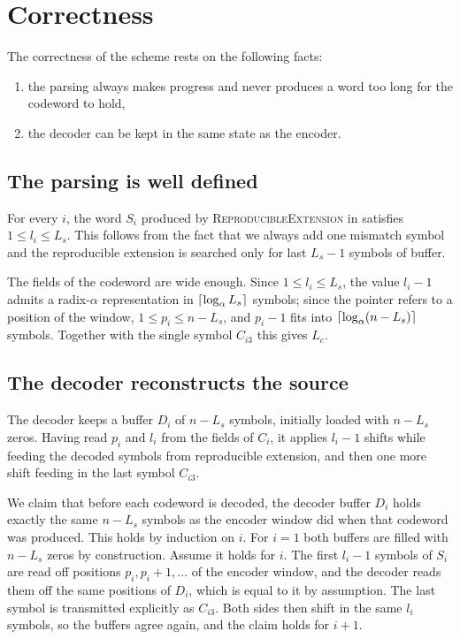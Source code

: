 
\section{Correctness}
\label{sec:lz77correctness}

The correctness of the scheme rests on the following facts:
\begin{enumerate}
    \item the parsing always makes progress and never produces a word too long for the codeword to hold,
    \item the decoder can be kept in the same state as the encoder.
\end{enumerate}

\subsection{The parsing is well defined}

For every \(i\), the word \(S_i\) produced by \textsc{ReproducibleExtension} in  satisfies \(1 \leq l_i \leq L_s\). This follows from the fact that we always add one mismatch symbol and the reproducible extension is searched only for last \(L_s - 1\) symbols of buffer.

The fields of the codeword are wide enough. Since \(1 \leq l_i \leq L_s\), the value \(l_i - 1\) admits a radix-\(\alpha\) representation in \(\left\lceil\log_\alpha L_s\right\rceil\) symbols; since the pointer refers to a position of the window, \(1 \leq p_i \leq n - L_s\), and \(p_i - 1\) fits into \(\left\lceil\log_\alpha (n - L_s)\right\rceil\) symbols. Together with the single symbol \(C_{i3}\) this gives \(L_c\).

\subsection{The decoder reconstructs the source}

The decoder keeps a buffer \(D_i\) of \(n - L_s\) symbols, initially loaded with \(n - L_s\) zeros. Having read \(p_i\) and \(l_i\) from the fields of \(C_i\), it applies \(l_i - 1\) shifts while feeding the decoded symbols from reproducible extension, and then one more shift feeding in the last symbol \(C_{i3}\).

We claim that before each codeword is decoded, the decoder buffer \(D_i\) holds exactly the same \(n - L_s\) symbols as the encoder window did when that codeword was produced. This holds by induction on \(i\). For \(i = 1\) both buffers are filled with \(n - L_s\) zeros by construction. Assume it holds for \(i\). The first \(l_i - 1\) symbols of \(S_i\) are read off positions \(p_i, p_i + 1, \ldots\) of the encoder window, and the decoder reads them off the same positions of \(D_i\), which is equal to it by assumption. The last symbol is transmitted explicitly as \(C_{i3}\). Both sides then shift in the same \(l_i\) symbols, so the buffers agree again, and the claim holds for \(i + 1\).


